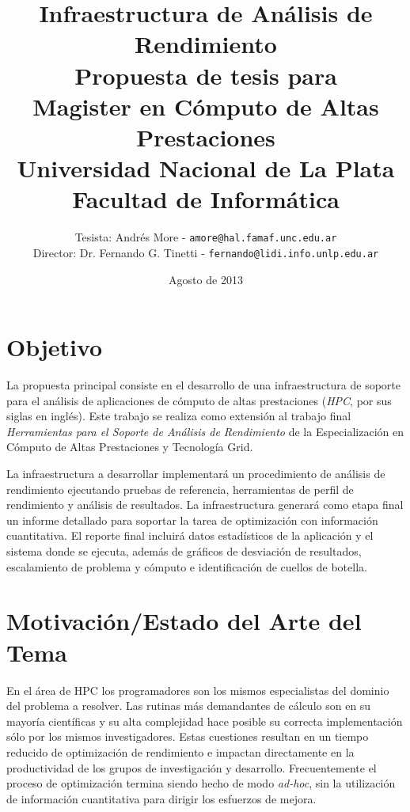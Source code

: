 \documentclass[a4paper]{article}
\begin{document}
\title{Infraestructura de Análisis de Rendimiento\\
\bigskip
{\large Propuesta de tesis para\\} Magister en Cómputo de Altas Prestaciones\\
\bigskip
Universidad Nacional de La Plata\\
Facultad de Informática\\
\bigskip
}

\author{Tesista: Andrés More - {\tt amore@hal.famaf.unc.edu.ar}\\
Director: Dr. Fernando G. Tinetti - {\tt fernando@lidi.info.unlp.edu.ar}}

\date{Agosto de 2013}

\maketitle

\newpage

\section{Objetivo}

La propuesta principal consiste en el desarrollo de una infraestructura de soporte para el análisis de aplicaciones de cómputo de altas prestaciones ({\it HPC}, por sus siglas en inglés). Este trabajo se realiza como extensión al trabajo final {\it Herramientas para el Soporte de Análisis de Rendimiento} de la Especialización en Cómputo de Altas Prestaciones y Tecnología Grid.

\bigskip

La infraestructura a desarrollar implementará un procedimiento de análisis de rendimiento ejecutando pruebas de referencia, herramientas de perfil de rendimiento y análisis de resultados. La infraestructura generará como etapa final un informe detallado para soportar la tarea de optimización con información cuantitativa.
El reporte final incluirá datos estadísticos de la aplicación y el sistema donde se ejecuta, además de gráficos de desviación de resultados, escalamiento de problema y cómputo e identificación de cuellos de botella.

\section{Motivación/Estado del Arte del Tema}

En el área de HPC los programadores son los mismos especialistas del dominio del problema a resolver. Las rutinas
más demandantes de cálculo son en su mayoría científicas y su alta complejidad hace posible su correcta implementación sólo por los mismos investigadores. Estas cuestiones resultan en un tiempo reducido de optimización de rendimiento
e impactan directamente en la productividad de los grupos de investigación y desarrollo. Frecuentemente el proceso de optimización termina siendo hecho de modo {\it ad-hoc}, sin la utilización de información cuantitativa para dirigir los
esfuerzos de mejora.
\end{document}
